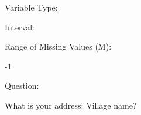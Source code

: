 \documentclass[
]{article}
\begin{document}
\begin{minipage}[t]{0.3\linewidth}

Variable Type:

\end{minipage}%
\begin{minipage}[t]{0.7\linewidth}

\end{minipage}

\begin{minipage}[t]{0.3\linewidth}

Interval:

\end{minipage}%
\begin{minipage}[t]{0.7\linewidth}

\end{minipage}

\begin{minipage}[t]{0.3\linewidth}

Range of Missing Values (M):

\end{minipage}%
\begin{minipage}[t]{0.7\linewidth}

-1

\end{minipage}

\begin{minipage}[t]{0.3\linewidth}

Question:

\end{minipage}%
\begin{minipage}[t]{0.7\linewidth}

What is your address: Village name?

\end{minipage}
\end{document}
